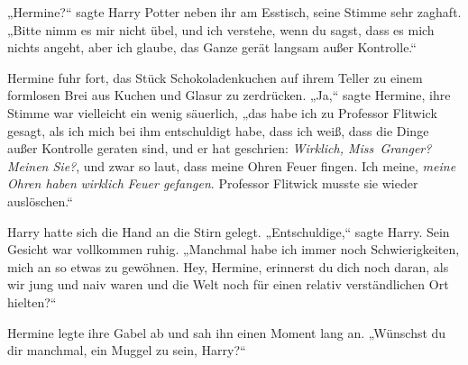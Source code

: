 „Hermine?“ sagte Harry Potter neben ihr am Esstisch, seine Stimme sehr zaghaft. „Bitte nimm es mir nicht übel, und ich verstehe, wenn du sagst, dass es mich nichts angeht, aber ich glaube, das Ganze gerät langsam außer Kontrolle.“

Hermine fuhr fort, das Stück Schokoladenkuchen auf ihrem Teller zu einem formlosen Brei aus Kuchen und Glasur zu zerdrücken. „Ja,“ sagte Hermine, ihre Stimme war vielleicht ein wenig säuerlich, „das habe ich zu Professor Flitwick gesagt, als ich mich bei ihm entschuldigt habe, dass ich weiß, dass die Dinge außer Kontrolle geraten sind, und er hat geschrien: \emph{Wirklich, Miss~Granger? Meinen Sie?}, und zwar so laut, dass meine Ohren Feuer fingen. Ich meine, \emph{meine Ohren haben} \emph{wirklich} \emph{Feuer gefangen}. Professor Flitwick musste sie wieder auslöschen.“

Harry hatte sich die Hand an die Stirn gelegt. „Entschuldige,“ sagte Harry. Sein Gesicht war vollkommen ruhig. „Manchmal habe ich immer noch Schwierigkeiten, mich an so etwas zu gewöhnen. Hey, Hermine, erinnerst du dich noch daran, als wir jung und naiv waren und die Welt noch für einen relativ verständlichen Ort hielten?“

Hermine legte ihre Gabel ab und sah ihn einen Moment lang an. „Wünschst du dir manchmal, ein Muggel zu sein, Harry?“

